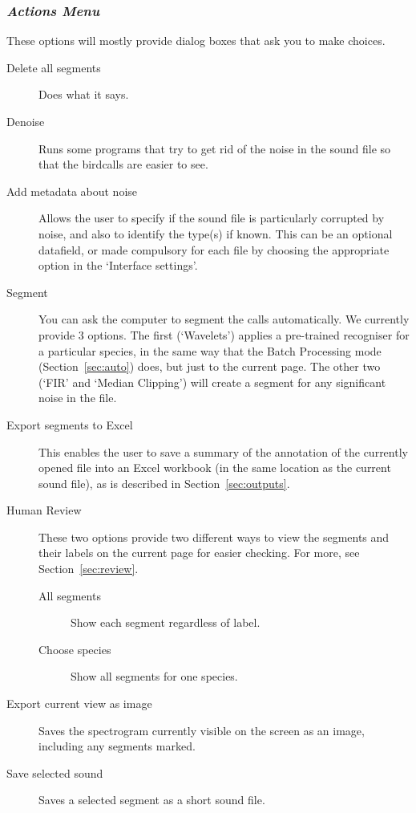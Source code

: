 \documentclass{article}
\begin{document}
\subsubsection{{\em Actions Menu}}
\label{sec:action}

These options will mostly provide dialog boxes that ask you to make choices. 

\begin{description}
\item [Delete all segments] Does what it says. 
\item [Denoise] Runs some programs that try to get rid of the noise in the sound file so that the birdcalls are easier to see. %
\item [Add metadata about noise] Allows the user to specify if the sound file is particularly corrupted by noise, and also to identify the type(s) if known. This can be an optional datafield, or made compulsory for each file by choosing the appropriate option in the `Interface settings'.
\item [Segment] You can ask the computer to segment the calls automatically. We currently provide 3 options. The first (`Wavelets') applies a pre-trained recogniser for a particular species, in the same way that the Batch Processing mode (Section~\ref{sec:auto}) does, but just to the current page. The other two (`FIR' and `Median Clipping') will create a segment for any significant noise in the file. 
\item [Export segments to Excel] This enables the user to save a summary of the annotation of the currently opened file into an Excel workbook (in the same location as the current sound file), as is described in Section~\ref{sec:outputs}. 
\item [Human Review] These two options provide two different ways to view the segments and their labels on the current page for easier checking. For more, see Section~\ref{sec:review}.
\begin{description}
\item[All segments] Show each segment regardless of label.
\item[Choose species] Show all segments for one species.
\end{description}
\item [Export current view as image] Saves the spectrogram currently visible on the screen as an image, including any segments marked. 
\item [Save selected sound] Saves a selected segment as a short sound file.
\end{description}
\end{document}
